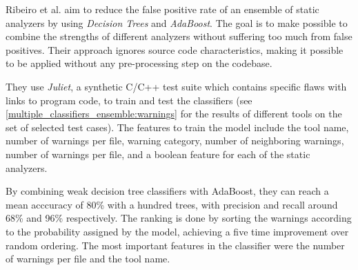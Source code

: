 \documentclass{article}
\begin{document}
 Ribeiro et al. \cite{multiple_ensemble} aim to reduce the false positive rate of an ensemble of static analyzers by using \textit{Decision Trees} and \textit{AdaBoost}. The goal is to make possible to combine the strengths of different analyzers without suffering too much from false positives. Their approach ignores source code characteristics, making it possible to be applied without any pre-processing step on the codebase.

 They use \textit{Juliet}, a synthetic C/C++ test suite which contains specific flaws with links to program code, to train and test the classifiers (see \cref{multiple_classifiers_ensemble:warnings} for the results of different tools on the set of selected test cases). The features to train the model include the tool name, number of warnings per file, warning category, number of neighboring warnings, number of warnings per file, and a boolean feature for each of the static analyzers.

 By combining weak decision tree classifiers with AdaBoost, they can reach a mean acccuracy of 80\% with a hundred trees, with precision and recall around 68\% and 96\% respectively. The ranking is done by sorting the warnings according to the probability assigned by the model, achieving a five time improvement over random ordering. The most important features in the classifier were the number of warnings per file and the tool name.
\end{document}
